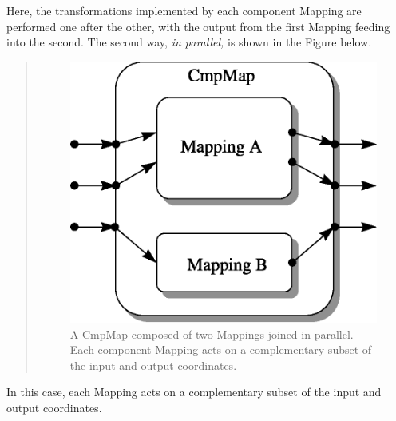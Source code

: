 \documentclass[twoside,11pt]{article}
\begin{document}
\begin{htmlonly}
   Here, the transformations implemented by each component Mapping are
   performed one after the other, with the output from the first Mapping
   feeding into the second.  The second way, {\em{in parallel,}} is shown in
   the Figure below.
   \begin{quote}
   \begin{figure}
   \label{fig:parallelcmpmap}
   \includegraphics[scale=1.0]{sun210_figures/parallel.eps}
   \caption{A CmpMap composed of two Mappings joined in parallel. Each
   component Mapping acts on a complementary subset of the input and
   output coordinates.}
   \end{figure}
   \end{quote}
\end{htmlonly}
In this case, each Mapping acts on a complementary subset of the
input and output coordinates.
\end{document}
